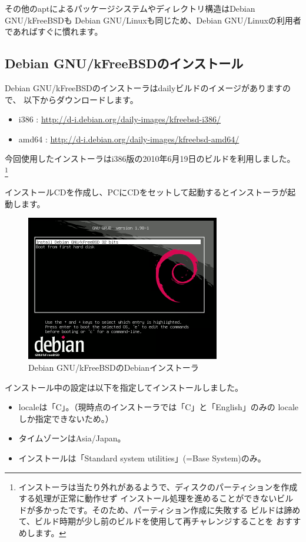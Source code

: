 \documentclass[mingoth,a4paper]{jsarticle}
\begin{document}
その他のaptによるパッケージシステムやディレクトリ構造はDebian GNU/kFreeBSDも
Debian GNU/Linuxも同じため、Debian GNU/Linuxの利用者であればすぐに慣れます。

\subsection{Debian GNU/kFreeBSDのインストール}

Debian GNU/kFreeBSDのインストーラはdailyビルドのイメージがありますので、
以下からダウンロードします。

\begin{itemize}
 \item i386  : \url{http://d-i.debian.org/daily-images/kfreebsd-i386/}
 \item amd64 : \url{http://d-i.debian.org/daily-images/kfreebsd-amd64/}
\end{itemize}

今回使用したインストーラはi386版の2010年6月19日のビルドを利用しました。
\footnote{インストーラは当たり外れがあるようで、ディスクのパーティションを作成する処理が正常に動作せず
インストール処理を進めることができないビルドが多かったです。そのため、パーティション作成に失敗する
ビルドは諦めて、ビルド時期が少し前のビルドを使用して再チャレンジすることを
おすすめします。}

インストールCDを作成し、PCにCDをセットして起動するとインストーラが起動します。

\begin{figure}[H]
\begin{center}
\includegraphics{image201008/kfreebsd-installer.png}
\caption{Debian GNU/kFreeBSDのDebianインストーラ}\label{debinstaller}
\end{center}
\end{figure}

インストール中の設定は以下を指定してインストールしました。

\begin{itemize}
 \item localeは「C」。（現時点のインストーラでは「C」と「English」のみの
localeしか指定できないため。）
 \item タイムゾーンはAsia/Japan。
 \item インストールは「Standard system utilities」(=Base System)のみ。
\end{itemize}
\end{document}
